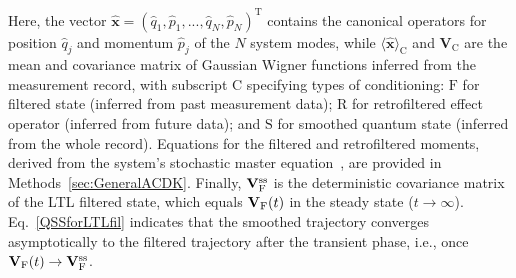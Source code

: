 \documentclass[aps,prx,twocolumn,amsmath,amssymb,superscriptaddress,floatfix,longbibliography
]{revtex4-2}
\begin{document}
Here, the vector $\hat{\mathbf{x}} = (\hat{q}_1,\hat{p}_1,...,\hat{q}_N,\hat{p}_N)^\text{T}$ contains the canonical operators for position $\hat{q}_j$ and momentum $\hat{p}_j$ of the $N$ system modes, while $\langle\hat{\mathbf{x}}\rangle_\text{C}$ and $\mathbf{V}_\text{C}$ are the mean and covariance matrix of Gaussian Wigner functions inferred from the measurement record, with subscript $\text{C}$ specifying types of conditioning: $\text{F}$ for filtered state (inferred from past measurement data); $\text{R}$ for retrofiltered effect operator (inferred from future data); and $\text{S}$ for smoothed quantum state (inferred from the whole record). Equations for the filtered and retrofiltered moments, derived from the system's stochastic master equation~\cite{laverick2021linear}, are provided in Methods~\ref{sec:GeneralACDK}. 
Finally, $\mathbf{V}_{\text F}^\text{ss}$ is the deterministic covariance matrix of the LTL filtered state, which equals $\mathbf{V}_{\text F}(t)$ in the steady state ($t \to \infty$). %
Eq.~\eqref{QSSforLTLfil} indicates that the smoothed trajectory converges asymptotically to the filtered trajectory after the transient phase, i.e., once $\mathbf{V}_{\text F}(t)\to\mathbf{V}_{\text F}^\text{ss}$. 

\end{document}
